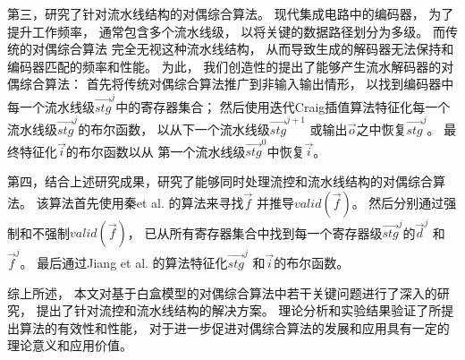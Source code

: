 \begin{cabstract}
第三，研究了针对流水线结构的对偶综合算法。
现代集成电路中的编码器，
为了提升工作频率，
通常包含多个流水线级，
以将关键的数据路径划分为多级。
而传统的对偶综合算法
完全无视这种流水线结构，
从而导致生成的解码器无法保持和编码器匹配的频率和性能。
为此，
我们创造性的提出了能够产生流水解码器的对偶综合算法：
首先将传统对偶综合算法推广到非输入输出情形，
以找到编码器中每一个流水线级$\vec{stg}^j$中的寄存器集合；
然后使用迭代Craig插值算法特征化每一个流水线级$\vec{stg}^j$的布尔函数，
以从下一个流水线级$\vec{stg}^{j+1}$ 或输出$\vec{o}$之中恢复$\vec{stg}^j$。
最终特征化$\vec{i}$的布尔函数以从
第一个流水线级$\vec{stg}^0$中恢复$\vec{i}$。

第四，结合上述研究成果，研究了能够同时处理流控和流水线结构的对偶综合算法。
该算法首先使用秦et al. 的算法来寻找$\vec{f}$ 并推导$valid(\vec{f})$。
然后分别通过强制和不强制$valid(\vec{f})$，
已从所有寄存器集合中找到每一个寄存器级$\vec{stg}^j$的$\vec{d}^j$ 和$\vec{f}^j$。
最后通过Jiang et al. 的算法特征化$\vec{stg}^j$ 和$\vec{i}$的布尔函数。

综上所述，
本文对基于白盒模型的对偶综合算法中若干关键问题进行了深入的研究，
提出了针对流控和流水线结构的解决方案。
理论分析和实验结果验证了所提出算法的有效性和性能，
对于进一步促进对偶综合算法的发展和应用具有一定的理论意义和应用价值。
\end{cabstract}

